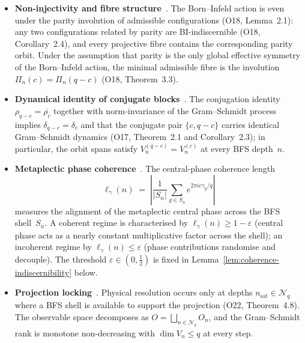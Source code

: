     \begin{itemize}
      \item \textbf{Non-injectivity and fibre structure}~\cite{O18}.
      The Born--Infeld action is even under the parity involution of admissible
      configurations (O18, Lemma~2.1): any two configurations related by parity
      are BI-indiscernible (O18, Corollary~2.4), and every projective fibre
      contains the corresponding parity orbit.
      Under the assumption that parity is the only global effective symmetry
      of the Born--Infeld action, the minimal admissible fibre is the involution
      $\Pi_n(c) = \Pi_n(q-c)$ (O18, Theorem~3.3).

      \item \textbf{Dynamical identity of conjugate blocks}~\cite{O17}.
      The conjugation identity $\rho_{q-c} = \overline{\rho_c}$ together with
      norm-invariance of the Gram--Schmidt process implies
      $\delta_{q-c} = \delta_c$ and that the conjugate pair $\{c, q-c\}$ carries
      identical Gram--Schmidt dynamics (O17, Theorem~2.1 and Corollary~2.3);
      in particular, the orbit spans satisfy $V_n^{(q-c)} = V_n^{(c)}$
      at every BFS depth~$n$.

      \item \textbf{Metaplectic phase coherence}~\cite{O12,O19}.
      The central-phase coherence length
      \begin{equation}
        \label{eq:coherence-length}
        \ell_\gamma(n)
        \;=\;
        \left|
          \frac{1}{|S_n|}
          \sum_{g \in S_n} e^{2\pi i c \gamma_g / q}
        \right|
      \end{equation}
      measures the alignment of the metaplectic central phase across the BFS
      shell~$S_n$.
      A coherent regime is characterised by $\ell_\gamma(n) \geq 1-\varepsilon$
      (central phase acts as a nearly constant multiplicative factor across the shell);
      an incoherent regime by $\ell_\gamma(n) \leq \varepsilon$
      (phase contributions randomise and decouple).
      The threshold $\varepsilon \in (0, \tfrac{1}{2})$ is fixed in
      Lemma~\ref{lem:coherence-indiscernibility} below.

      \item \textbf{Projection locking}~\cite{O22}.
      Physical resolution occurs only at depths $n_{\mathrm{sat}} \in \mathcal{N}_q$
      where a BFS shell is available to support the projection
      (O22, Theorem~4.8).
      The observable space decomposes as
      $O = \bigsqcup_{n \in \mathcal{N}_q} O_n$,
      and the Gram--Schmidt rank is monotone non-decreasing with
      $\dim V_n \leq q$ at every step.
    \end{itemize}

